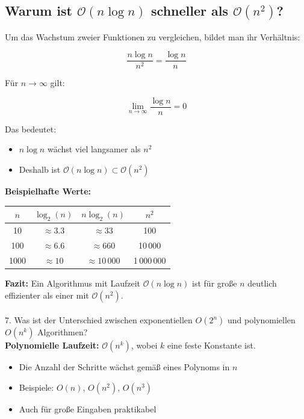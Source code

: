 \documentclass[a4paper,12pt]{article}
\begin{document}
		\subsection*{Warum ist \( \mathcal{O}(n \log n) \) schneller als \( \mathcal{O}(n^2) \)?}
		
		Um das Wachstum zweier Funktionen zu vergleichen, bildet man ihr Verhältnis:
		
		\[
		\frac{n \log n}{n^2} = \frac{\log n}{n}
		\]
		
		Für \( n \to \infty \) gilt:
		
		\[
		\lim_{n \to \infty} \frac{\log n}{n} = 0
		\]
		
		Das bedeutet:
		\begin{itemize}
			\item \( n \log n \) wächst viel langsamer als \( n^2 \)
			\item Deshalb ist \( \mathcal{O}(n \log n) \subset \mathcal{O}(n^2) \)
		\end{itemize}
		
		\vspace{1em}
		
		\textbf{Beispielhafte Werte:}
		
		\begin{center}
			\begin{tabular}{@{}cccc@{}}
				\toprule
				\( n \) & \( \log_2(n) \) & \( n \log_2(n) \) & \( n^2 \) \\
				\midrule
				10 & \(\approx 3.3\) & \(\approx 33\) & 100 \\
				100 & \(\approx 6.6\) & \(\approx 660\) & 10\,000 \\
				1000 & \(\approx 10\) & \(\approx 10\,000\) & 1\,000\,000 \\
				\bottomrule
			\end{tabular}
		\end{center}
		
		\textbf{Fazit:}  
		Ein Algorithmus mit Laufzeit \( \mathcal{O}(n \log n) \) ist für große \( n \) deutlich effizienter als einer mit \( \mathcal{O}(n^2) \).\\
		\\7. Was ist der Unterschied zwischen exponentiellen $O(2^n)$ und polynomiellen $O(n^k)$ Algorithmen?\\
		
		\textbf{Polynomielle Laufzeit:} \( \mathcal{O}(n^k) \), wobei \( k \) eine feste Konstante ist.
		
		\begin{itemize}
			\item Die Anzahl der Schritte wächst gemäß eines Polynoms in \( n \)
			\item Beispiele: \( O(n) \), \( O(n^2) \), \( O(n^3) \)
			\item Auch für große Eingaben praktikabel
		\end{itemize}
		
\end{document}
